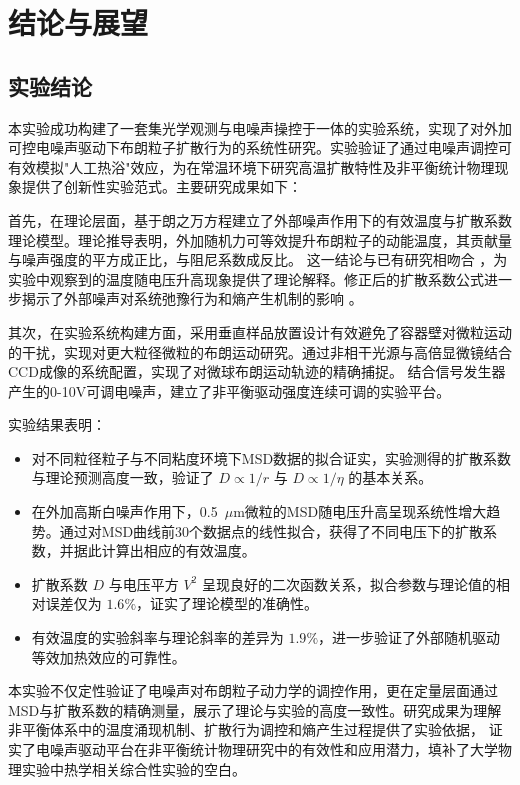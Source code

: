 \documentclass[a4paper]{report} %
\begin{document}
\chapter{结论与展望}
\section{实验结论}
本实验成功构建了一套集光学观测与电噪声操控于一体的实验系统，实现了对外加可控电噪声驱动下布朗粒子扩散行为的系统性研究。实验验证了通过电噪声调控可有效模拟"人工热浴"效应，为在常温环境下研究高温扩散特性及非平衡统计物理现象提供了创新性实验范式。主要研究成果如下：

首先，在理论层面，基于朗之万方程建立了外部噪声作用下的有效温度与扩散系数理论模型。理论推导表明，外加随机力可等效提升布朗粒子的动能温度，其贡献量与噪声强度的平方成正比，与阻尼系数成反比。
这一结论与已有研究相吻合 \cite{Martinez2013,Roldan2014}，为实验中观察到的温度随电压升高现象提供了理论解释。修正后的扩散系数公式进一步揭示了外部噪声对系统弛豫行为和熵产生机制的影响 \cite{Leighton2024}。

其次，在实验系统构建方面，采用垂直样品放置设计有效避免了容器壁对微粒运动的干扰，实现对更大粒径微粒的布朗运动研究。通过非相干光源与高倍显微镜结合CCD成像的系统配置，实现了对微球布朗运动轨迹的精确捕捉。
结合信号发生器产生的0-10V可调电噪声，建立了非平衡驱动强度连续可调的实验平台。

实验结果表明：
\begin{itemize}
    \item 对不同粒径粒子与不同粘度环境下MSD数据的拟合证实，实验测得的扩散系数与理论预测高度一致，验证了 $D \propto 1/r$ 与 $D \propto 1/\eta$ 的基本关系。
    \item 在外加高斯白噪声作用下，0.5~$\mu$m微粒的MSD随电压升高呈现系统性增大趋势。通过对MSD曲线前30个数据点的线性拟合，获得了不同电压下的扩散系数，并据此计算出相应的有效温度。
    \item 扩散系数 $D$ 与电压平方 $V^2$ 呈现良好的二次函数关系，拟合参数与理论值的相对误差仅为 $1.6\%$，证实了理论模型的准确性。
    \item 有效温度的实验斜率与理论斜率的差异为 $1.9\%$，进一步验证了外部随机驱动等效加热效应的可靠性。
\end{itemize}

本实验不仅定性验证了电噪声对布朗粒子动力学的调控作用，更在定量层面通过MSD与扩散系数的精确测量，展示了理论与实验的高度一致性。研究成果为理解非平衡体系中的温度涌现机制、扩散行为调控和熵产生过程提供了实验依据，
证实了电噪声驱动平台在非平衡统计物理研究中的有效性和应用潜力，填补了大学物理实验中热学相关综合性实验的空白。
\end{document}
